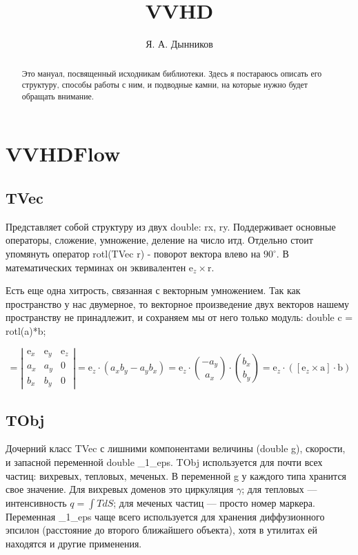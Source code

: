 \documentclass[14pt]{extreport}
\title{VVHD}
\author{Я. А. Дынников}
\newcommand{\br}[1]{\boldsymbol{\mathrm{#1}}}
\begin{document}
\maketitle

\begin{abstract}
Это мануал, посвященный исходникам библиотеки. Здесь я постараюсь 
описать его структуру, способы работы с ним, и подводные камни, 
на которые нужно будет обращать внимание.
\end{abstract}

\chapter{VVHDFlow}

\section{TVec}
Представляет собой структуру из двух double: rx, ry.
Поддерживает основные операторы, сложение, умножение, деление на число итд.
Отдельно стоит упомянуть оператор rotl(TVec $\br r$) - поворот вектора влево на $90^{\circ}$. В математических терминах он эквивалентен $\br e_z \times \br r$.

Есть еще одна хитрость, связанная с векторным умножением. Так как пространство у нас двумерное, то векторное произведение двух векторов нашему пространству не принадлежит, и сохраняем мы от него только модуль: double c = rotl(a)*b;

\begin{equation*}
[\br a \times \br b] = \left|\begin{array}{ccc}
\br e_x & \br e_y & \br e_z \\
a_x & a_y & 0 \\
b_x & b_y & 0 \end{array}\right| = \br e_z \cdot (a_x b_y - a_y b_x) = \br e_z \cdot \binom{-a_y}{a_x} \cdot \binom{b_x}{b_y} = \br e_z \cdot \left( [\br e_z \times \br a] \cdot \br b \right)
\end{equation*}

\section{TObj}
Дочерний класс TVec с лишними компонентами величины (double g), скорости, и запасной переменной double \_1\_eps. TObj используется для почти всех частиц: вихревых, тепловых, меченых. В переменной g у каждого типа хранится свое значение. Для вихревых доменов это циркуляция $\gamma$; для тепловых --- интенсивность $q = \int TdS$; для меченых частиц --- просто номер маркера. Переменная \_1\_eps чаще всего используется для хранения диффузионного эпсилон (расстояние до второго ближайшего объекта), хотя в утилитах ей находятся и другие применения.
\end{document}
